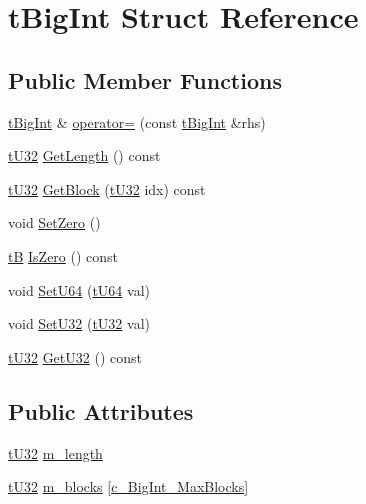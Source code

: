 \hypertarget{structtBigInt}{}\section{t\+Big\+Int Struct Reference}
\label{structtBigInt}
\subsection*{Public Member Functions}
\begin{DoxyCompactItemize}
\item 
\hyperlink{structtBigInt}{t\+Big\+Int} \& \hyperlink{structtBigInt_a6527277620819a6ff4f9386ad2ad0a41}{operator=} (const \hyperlink{structtBigInt}{t\+Big\+Int} \&rhs)
\item 
\hyperlink{dstandard_8h_aee96db7e18784e05ed6b0bcaeec3f7f6}{t\+U32} \hyperlink{structtBigInt_aee567e4c77187577f77fc1643dc427ba}{Get\+Length} () const 
\item 
\hyperlink{dstandard_8h_aee96db7e18784e05ed6b0bcaeec3f7f6}{t\+U32} \hyperlink{structtBigInt_a22350ff8e7010047b7ac5be70e8906bd}{Get\+Block} (\hyperlink{dstandard_8h_aee96db7e18784e05ed6b0bcaeec3f7f6}{t\+U32} idx) const 
\item 
void \hyperlink{structtBigInt_ae3c29c64e80671de21feffc84d2c18c7}{Set\+Zero} ()
\item 
\hyperlink{dstandard_8h_ad203aed3ab57b120eb54c2043f60dc49}{tB} \hyperlink{structtBigInt_a4e0c59f15fcb292ea4ec5d448fa10b58}{Is\+Zero} () const 
\item 
void \hyperlink{structtBigInt_ab25f77e908d231d8836355cf4586f983}{Set\+U64} (\hyperlink{dstandard_8h_a6625ae5505b2f796350b82c7f52fcf43}{t\+U64} val)
\item 
void \hyperlink{structtBigInt_a1aec50a9a3a9129b283c43eecc6df8c3}{Set\+U32} (\hyperlink{dstandard_8h_aee96db7e18784e05ed6b0bcaeec3f7f6}{t\+U32} val)
\item 
\hyperlink{dstandard_8h_aee96db7e18784e05ed6b0bcaeec3f7f6}{t\+U32} \hyperlink{structtBigInt_ac12a9ba9bd8e710b3853a13a7b789151}{Get\+U32} () const 
\end{DoxyCompactItemize}
\subsection*{Public Attributes}
\begin{DoxyCompactItemize}
\item 
\hyperlink{dstandard_8h_aee96db7e18784e05ed6b0bcaeec3f7f6}{t\+U32} \hyperlink{structtBigInt_a86287c0800ba611962655553025b4920}{m\+\_\+length}
\item 
\hyperlink{dstandard_8h_aee96db7e18784e05ed6b0bcaeec3f7f6}{t\+U32} \hyperlink{structtBigInt_a5e3b7b252d975532d51ae7ced6699351}{m\+\_\+blocks} \mbox{[}\hyperlink{dragon4_8cpp_af3325cd84c7aeec94a132d7a160b4505}{c\+\_\+\+Big\+Int\+\_\+\+Max\+Blocks}\mbox{]}
\end{DoxyCompactItemize}


